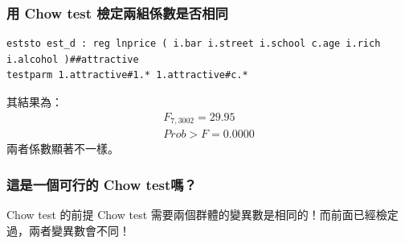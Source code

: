 \begin{frame}[fragile]
    \frametitle{用 Chow test 檢定兩組係數是否相同}

\begin{lstlisting}
eststo est_d : reg lnprice ( i.bar i.street i.school c.age i.rich i.alcohol )##attractive
testparm 1.attractive#1.* 1.attractive#c.*
\end{lstlisting}

其結果為：
\begin{align*}
    F_{7,  3002} =   29.95 \\
    Prob > F =    0.0000
\end{align*}
兩者係數顯著不一樣。


\end{frame}

\begin{frame}
    \frametitle{這是一個可行的 Chow test嗎？}

    \begin{alertblock}{Chow test 的前提}
        Chow test 需要兩個群體的變異數是相同的！而前面已經檢定過，兩者變異數會不同！
    \end{alertblock}

    

\end{frame}